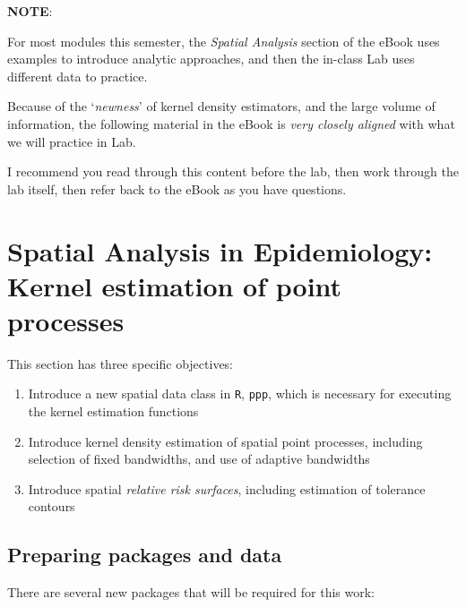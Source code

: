 \documentclass[
]{book}
\providecommand{\tightlist}{%
  \setlength{\itemsep}{0pt}\setlength{\parskip}{0pt}}
\newenvironment{rmdnote}[1]
  {
  \begin{itemize}
  \renewcommand{\labelitemi}{
    \raisebox{-.7\height}[0pt][0pt]{
      {\setkeys{Gin}{width=3em,keepaspectratio}\texttt{[image: images/\#1]}}
    }
  }
  \setlength{\fboxsep}{1em}
  \begin{note}
  \item
  }
  {
  \end{note}
  \end{itemize}
  }
\begin{document}
\begin{rmdnote}{note}
\textbf{NOTE}:

For most modules this semester, the \emph{Spatial Analysis} section of the eBook uses examples to introduce analytic approaches, and then the in-class Lab uses different data to practice.

Because of the `\emph{newness}' of kernel density estimators, and the large volume of information, the following material in the eBook is \emph{very closely aligned} with what we will practice in Lab.

I recommend you read through this content before the lab, then work through the lab itself, then refer back to the eBook as you have questions.

\end{rmdnote}

\hypertarget{spatial-analysis-in-epidemiology-kernel-estimation-of-point-processes}{%
\section{Spatial Analysis in Epidemiology: Kernel estimation of point processes}\label{spatial-analysis-in-epidemiology-kernel-estimation-of-point-processes}}

This section has three specific objectives:

\begin{enumerate}
\def\labelenumi{\arabic{enumi}.}
\tightlist
\item
  Introduce a new spatial data class in \texttt{R}, \texttt{ppp}, which is necessary for executing the kernel estimation functions
\item
  Introduce kernel density estimation of spatial point processes, including selection of fixed bandwidths, and use of adaptive bandwidths
\item
  Introduce spatial \emph{relative risk surfaces}, including estimation of tolerance contours
\end{enumerate}

\hypertarget{preparing-packages-and-data}{%
\subsection{Preparing packages and data}\label{preparing-packages-and-data}}

There are several new packages that will be required for this work:
\end{document}
